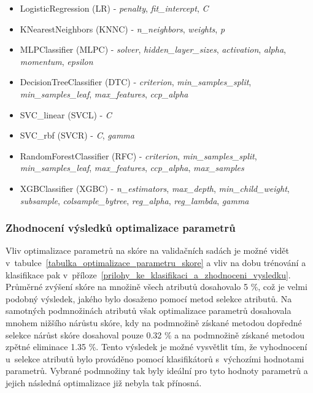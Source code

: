 \begin{itemize}
    \item LogisticRegression (LR) - \textit{penalty}, \textit{fit\_intercept}, \textit{C}
    \item KNearestNeighbors (KNNC) - \textit{n\_neighbors}, \textit{weights}, \textit{p}
    \item MLPClassifier (MLPC) - \textit{solver}, \textit{hidden\_layer\_sizes}, \textit{activation}, \textit{alpha}, \textit{momentum}, \textit{epsilon}
    \item DecisionTreeClassifier (DTC) - \textit{criterion}, \textit{min\_samples\_split}, \textit{min\_samples\_leaf}, \textit{max\_features}, \textit{ccp\_alpha}
    \item SVC\_linear (SVCL) - \textit{C}
    \item SVC\_rbf (SVCR) - \textit{C}, \textit{gamma}
    \item RandomForestClassifier (RFC) - \textit{criterion}, \textit{min\_samples\_split}, \textit{min\_samples\_leaf}, \textit{max\_features}, \textit{ccp\_alpha}, \textit{max\_samples}
    \item XGBClassifier (XGBC) - \textit{n\_estimators}, \textit{max\_depth}, \textit{min\_child\_weight}, \textit{subsample}, \textit{colsample\_bytree}, \textit{reg\_alpha}, \textit{reg\_lambda}, \textit{gamma}
\end{itemize}

\subsubsection*{Zhodnocení výsledků optimalizace parametrů}
\label{NIS_zhodnoceni_vysledku_optimalizace_parametru}

Vliv optimalizace parametrů na skóre na validačních sadách je možné vidět v~tabulce~\ref{tabulka_optimalizace_parametru_skore} a vliv na dobu trénování a klasifikace pak v~příloze~\ref{prilohy_ke_klasifikaci_a_zhodnoceni_vysledku}. Průměrné zvýšení skóre na množině všech atributů dosahovalo 5 \%, což je velmi podobný výsledek, jakého bylo dosaženo pomocí metod selekce atributů. Na samotných podmnožinách atributů však optimalizace parametrů dosahovala mnohem nižšího nárůstu skóre, kdy na podmnožině získané metodou dopředné selekce nárůst skóre dosahoval pouze 0.32 \% a na podmnožině získané metodou zpětné eliminace 1.35 \%. Tento výsledek je možné vysvětlit tím, že vyhodnocení u~selekce atributů bylo prováděno pomocí klasifikátorů s~výchozími hodnotami parametrů. Vybrané podmnožiny tak byly ideální pro tyto hodnoty parametrů a jejich následná optimalizace již nebyla tak přínosná.


